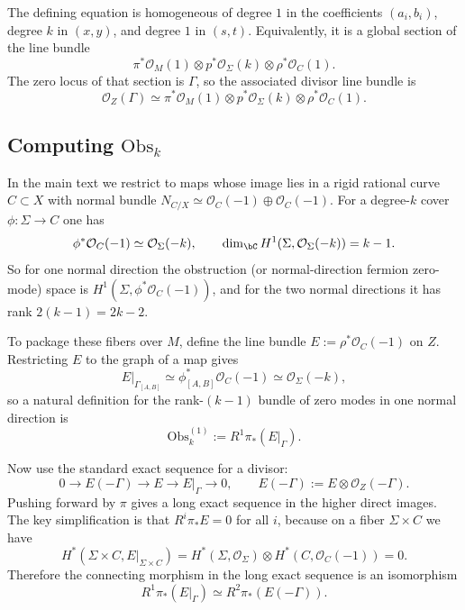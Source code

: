 \documentclass[12pt]{article}
\begin{document}
The defining equation is homogeneous of degree $1$ in the coefficients
$(a_i,b_i)$, degree $k$ in $(x,y)$, and degree $1$ in $(s,t)$. Equivalently, it
is a global section of the line bundle
\begin{equation*}
  \pi^*\mathcal{O}_M(1)\otimes p^*\mathcal{O}_\Sigma(k)\otimes \rho^*\mathcal{O}_C(1).
\end{equation*}
The zero locus of that section is $\Gamma$, so the associated divisor line
bundle is
\begin{equation*}
  \mathcal{O}_Z(\Gamma)\simeq \pi^*\mathcal{O}_M(1)\otimes p^*\mathcal{O}_\Sigma(k)\otimes \rho^*\mathcal{O}_C(1).
\end{equation*}

\subsection{Computing \texorpdfstring{$\mathrm{Obs}_k$}{Obs\_k}}
In the main text we restrict to maps whose image lies in a rigid rational curve
$C\subset X$ with normal bundle $N_{C/X}\simeq\mathcal{O}_C(-1)\oplus\mathcal{O}_C(-1)$.
For a degree-$k$ cover $\phi:\Sigma\to C$ one has
\begin{equation*}
  \phi^*\mathcal{O}_C(-1)\simeq \mathcal{O}_\Sigma(-k),
  \qquad
  \dim_\bC H^1(\Sigma,\mathcal{O}_\Sigma(-k))=k-1.
\end{equation*}
So for one normal direction the obstruction (or normal-direction fermion
zero-mode) space is $H^1(\Sigma,\phi^*\mathcal{O}_C(-1))$, and for the two
normal directions it has rank $2(k-1)=2k-2$.

To package these fibers over $M$, define the line bundle $E:=\rho^*\mathcal{O}_C(-1)$ on $Z$.
Restricting $E$ to the graph of a map gives
\begin{equation*}
  E|_{\Gamma_{[A,B]}}\simeq \phi_{[A,B]}^*\mathcal{O}_C(-1)\simeq\mathcal{O}_\Sigma(-k),
\end{equation*}
so a natural definition for the rank-$(k-1)$ bundle of zero modes in one normal
direction is
\begin{equation*}
  \mathrm{Obs}^{(1)}_k := R^1\pi_*(E|_\Gamma).
\end{equation*}

Now use the standard exact sequence for a divisor:
\begin{equation*}
  0\to E(-\Gamma)\to E\to E|_\Gamma\to 0,
  \qquad
  E(-\Gamma):=E\otimes\mathcal{O}_Z(-\Gamma).
\end{equation*}
Pushing forward by $\pi$ gives a long exact sequence in the higher direct
images. The key simplification is that $R^i\pi_*E=0$ for all $i$, because on a
fiber $\Sigma\times C$ we have
\begin{equation*}
  H^*(\Sigma\times C, E|_{\Sigma\times C})
  = H^*(\Sigma,\mathcal{O}_\Sigma)\otimes H^*(C,\mathcal{O}_C(-1))
  = 0.
\end{equation*}
Therefore the connecting morphism in the long exact sequence is an isomorphism
\begin{equation*}
  R^1\pi_*(E|_\Gamma)\simeq R^2\pi_*(E(-\Gamma)).
\end{equation*}
\end{document}
